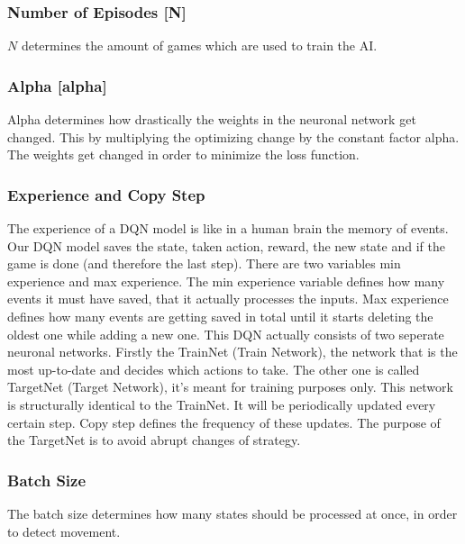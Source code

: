 \documentclass[12pt]{article}
\def\alpha{alpha}%
\def\({}%
\def\){}%
\begin{document}
\subsubsection{Number of Episodes [\(N\)]}
$N$ determines the amount of games which are used to train the AI.

\subsubsection{Alpha [\(\alpha\)]}
Alpha determines how drastically the weights in the neuronal network get changed. This by multiplying the optimizing change by the constant factor alpha. The weights get changed in order to minimize the loss function.

\subsubsection{Experience and Copy Step}\label{sssec:copy_step}
The experience of a DQN model is like in a human brain the memory of events. Our DQN model saves the state, taken action, reward, the new state and if the game is done (and therefore the last step). There are two variables min experience and max experience. The min experience variable defines how many events it must have saved, that it actually processes the inputs. Max experience defines how many events are getting saved in total until it starts deleting the oldest one while adding a new one. 
This DQN actually consists of two seperate neuronal networks. Firstly the TrainNet (Train Network), the network that is the most up-to-date and decides which actions to take. The other one is called TargetNet (Target Network), it’s meant for training purposes only. This network is structurally identical to the TrainNet. It will be periodically updated every certain step. Copy step defines the frequency of these updates. The purpose of the TargetNet is to avoid abrupt changes of strategy. 

\subsubsection{Batch Size}
The batch size determines how many states should be processed at once, in order to detect movement. 
\end{document}
